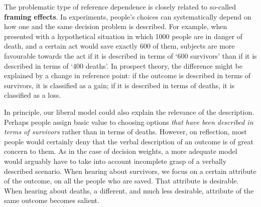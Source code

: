 
The problematic type of reference dependence is closely related to
so-called \textbf{framing effects}. In experiments, people's choices
can systematically depend on how one and the same decision problem is
described. For example, when presented with a hypothetical situation
in which 1000 people are in danger of death, and a certain act would
save exactly 600 of them, subjects are more favourable towards the act
if it is described in terms of `600 survivors' than if it is described
in terms of `400 deaths'. In prospect theory, the difference might be
explained by a change in reference point: if the outcome is described
in terms of survivors, it is classified as a gain; if it is described
in terms of deaths, it is classified as a loss.

In principle, our liberal model could also explain the relevance of
the description. Perhaps people assign basic value to choosing options
\emph{that have been described in terms of survivors} rather than in
terms of deaths. However, on reflection, most people would certainly
deny that the verbal description of an outcome is of great concern to
them. As in the case of decision weights, a more adequate model would
arguably have to take into account incomplete grasp of a verbally
described scenario. When hearing about survivors, we focus on a
certain attribute of the outcome, on all the people who are
saved. That attribute is desirable. When hearing about deaths, a
different, and much less desirable, attribute of the same outcome
becomes salient.

